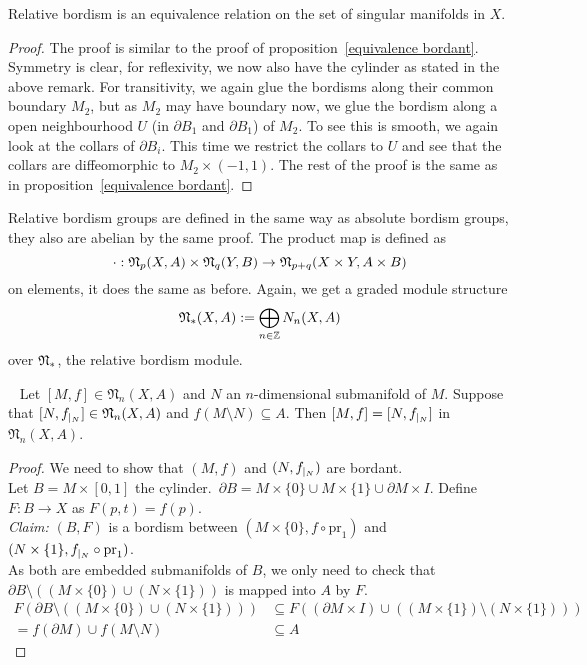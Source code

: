 \documentclass[a4paper,11pt]{article}
\begin{document}
\begin{theorem}\cite[p.525]{dieck}
    Relative bordism is an equivalence relation on the set of singular manifolds in \(X\).
\end{theorem}

\begin{proof}
    The proof is similar to the proof of proposition\ \ref{equivalence bordant}. Symmetry is clear, for reflexivity, we now also have the cylinder as stated in the above remark. For transitivity, we again glue the bordisms along their common boundary \(M_2\), but as \(M_2\) may have boundary now, we glue the bordism along a open neighbourhood \(U\) (in \(\partial B_1\) and \(\partial B_1\)) of \(M_2\). To see this is smooth, we again look at the collars of \(\partial B_i\). This time we restrict the collars to \(U\) and see that the collars are diffeomorphic to \(M_2\times(-1,1)\). The rest of the proof is the same as in proposition\ \ref{equivalence bordant}.
\end{proof}

Relative bordism groups are defined in the same way as absolute bordism groups, they also are abelian by the same proof. The product map is defined as \[\cdot:\mathfrak{N}_p(X,A)\times\mathfrak{N}_q(Y,B)\to\mathfrak{N}_{p+q}(X\times Y, A\times B)\]
on elements, it does the same as before. Again, we get a graded module structure
\[\mathfrak{N}_\ast(X,A):= \bigoplus_{n\in\mathbb{Z}}N_n(X,A)\]
over \(\mathfrak{N}_\ast\), the relative bordism module.

\begin{lemma}\ \cite[VIII, Lemma 13.10]{tomdieck} \label{almost excision} %
    Let \([M,f]\in\mathfrak{N}_n(X,A)\) and \(N\) an \(n\)-dimensional submanifold of \(M\). 
    Suppose that \([N,f_{|_{N}}]\in\mathfrak{N}_n(X,A)\) and \(f(M\setminus N)\subseteq A\). 
    Then \([M,f]=[N,f_{|_{N}}]\) in \(\mathfrak{N}_n(X,A)\).
\end{lemma}

\begin{proof}\cite{tomdieck}
    We need to show that \((M,f)\) and \((N,f_{|_{N}})\) are bordant.\\
    Let \(B=M\times [0,1]\) the cylinder.\ \(\partial B= M\times\{0\}\cup M\times\{1\}\cup \partial M\times I\). Define \(F:B\to X\) as \(F(p,t)=f(p)\).\\
    \textit{Claim:} \((B,F)\) is a bordism between \((M\times \{0\},f\circ\mathrm{pr}_1)\) and \((N\times \{1\}, f_{|_{N}}\circ\mathrm{pr}_1)\).\\
    As both are embedded submanifolds of \(B\), we only need to check that \(\partial B\setminus((M\times \{0\})\cup (N\times\{1\}))\) is mapped into \(A\) by \(F\).
    \begin{align*}
        F(\partial B\setminus((M\times \{0\})\cup (N\times\{1\})))&\subseteq F((\partial M\times I)\cup ((M\times\{1\})\setminus (N\times \{1\})))\\
        =f(\partial M)\cup f(M\setminus N)&\subseteq A
    \end{align*}
\end{proof}
\end{document}
